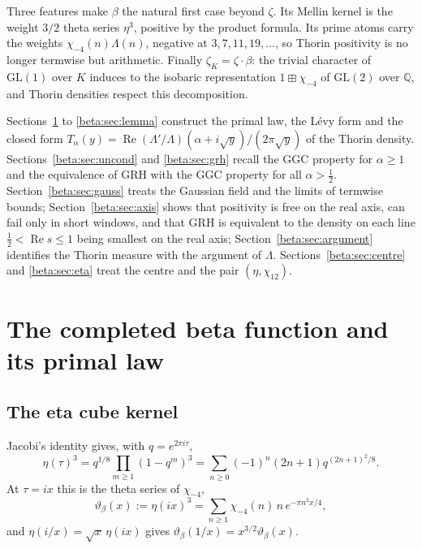 Three features make $\beta$ the natural first case beyond $\zeta$. Its Mellin kernel is the weight $3/2$ theta series $\eta^3$, positive by the product formula. Its prime atoms carry the weights $\chi_{-4}(n)\Lambda(n)$, negative at $3,7,11,19,\dots$, so Thorin positivity is no longer termwise but arithmetic. Finally $\zeta_K=\zeta\cdot\beta$: the trivial character of $\mathrm{GL}(1)$ over $K$ induces to the isobaric representation $1\boxplus\chi_{-4}$ of $\mathrm{GL}(2)$ over $\mathbb Q$, and Thorin densities respect this decomposition.

Sections~\ref{beta:sec:primal} to \ref{beta:sec:lemma} construct the primal law, the L\'evy form and the closed form $T_\alpha(y)=\operatorname{Re}(\Lambda'/\Lambda)(\alpha+i\sqrt y)/(2\pi\sqrt y)$ of the Thorin density. Sections~\ref{beta:sec:uncond} and \ref{beta:sec:grh} recall the GGC property for $\alpha\ge1$ and the equivalence of GRH with the GGC property for all $\alpha>\tfrac12$. Section~\ref{beta:sec:gauss} treats the Gaussian field and the limits of termwise bounds; Section~\ref{beta:sec:axis} shows that positivity is free on the real axis, can fail only in short windows, and that GRH is equivalent to the density on each line $\tfrac12<\operatorname{Re} s\le1$ being smallest on the real axis; Section~\ref{beta:sec:argument} identifies the Thorin measure with the argument of $\Lambda$. Sections~\ref{beta:sec:centre} and \ref{beta:sec:eta} treat the centre and the pair $(\eta,\chi_{12})$.


\section{The completed beta function and its primal law}\label{beta:sec:primal}

\subsection{The eta cube kernel}
Jacobi's identity gives, with $q=e^{2\pi i\tau}$,
\begin{equation}\label{beta:eq:jacobi}
\eta(\tau)^3=q^{1/8}\prod_{m\ge1}(1-q^m)^3=\sum_{n\ge0}(-1)^n(2n+1)q^{(2n+1)^2/8}.
\end{equation}
At $\tau=ix$ this is the theta series of $\chi_{-4}$,
\begin{equation}\label{beta:eq:theta}
\vartheta_\beta(x):=\eta(ix)^3=\sum_{n\ge1}\chi_{-4}(n)\,n\,e^{-\pi n^2x/4},
\end{equation}
and $\eta(i/x)=\sqrt x\,\eta(ix)$ gives $\vartheta_\beta(1/x)=x^{3/2}\vartheta_\beta(x)$.

